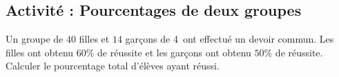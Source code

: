 
\subsection{Activité : Pourcentages de deux groupes}

Un groupe de $40$ filles et \( 14\) garçons de 4\ieme\ ont effectué un devoir commun. Les filles ont obtenu $60$\% de réussite et les garçons ont obtenu $50$\% de réussite. Calculer le pourcentage total d'élèves ayant réussi.
